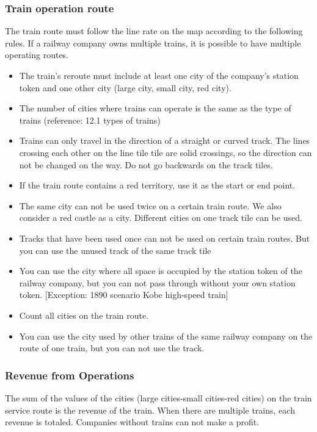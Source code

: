 \documentclass{article}
\begin{document}
\begin{CJK}{UTF8}{min}
\subsubsection{Train operation route}
The train route must follow the line rate on the map according to the
following rules. If a railway company owns multiple trains, it is
possible to have multiple operating routes.
\begin{itemize}
\item The train's reroute must include at least one city of the
  company's station token and one other city (large city, small city,
  red city).

\item The number of cities where trains can operate is the same as the
  type of trains (reference: 12.1 types of trains)

\item Trains can only travel in the direction of a straight or curved
  track. The lines crossing each other on the line tile tile are solid
  crossings, so the direction can not be changed on the way. Do not go
  backwards on the track tiles.

\item If the train route contains a red territory, use it as the start
  or end point.

\item The same city can not be used twice on a certain train route. We
  also consider a red castle as a city. Different cities on one track
  tile can be used.

\item Tracks that have been used once can not be used on certain train
  routes. But you can use the unused track of the same track tile

\item You can use the city where all space is occupied by the station
  token of the railway company, but you can not pass through without
  your own station token. [Exception: 1890 scenario Kobe high-speed
  train]

\item Count all cities on the train route.

\item You can use the city used by other trains of the same railway
  company on the route of one train, but you can not use the track.
\end{itemize}

\subsubsection{Revenue from Operations}
The sum of the values ​​of the cities (large cities-small cities-red
cities) on the train service route is the revenue of the train. When
there are multiple trains, each revenue is totaled. Companies without
trains can not make a profit.


\end{CJK}
\end{document}
